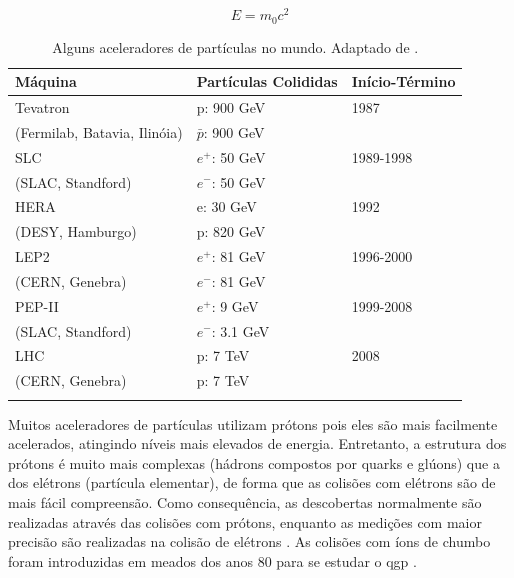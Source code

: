 
\begin{equation} \label{eq:einstein}
E=m_0c^2
\end{equation}

\begin{table}
\centering
\begin{tabular}{lll}
\hline \hline \hline
\textbf{Máquina} & \textbf{Partículas Colididas} & \textbf{Início-Término} \\
\hline \hline
Tevatron & p: 900 GeV & 1987 \\
(Fermilab, Batavia, Ilinóia) & $\bar{p}$: 900 GeV & \\
\hline
SLC & $e^{+}$: 50 GeV & 1989-1998 \\
(SLAC, Standford) & $e^{-}$: 50 GeV & \\
\hline
HERA & e: 30 GeV & 1992 \\
(DESY, Hamburgo) & p: 820 GeV & \\
\hline
LEP2 & $e^{+}$: 81 GeV & 1996-2000 \\
(CERN, Genebra) & $e^{-}$: 81 GeV & \\
\hline
PEP-II & $e^{+}$: 9 GeV & 1999-2008 \\
(SLAC, Standford) & $e^{-}$: 3.1 GeV & \\
\hline
LHC & p: 7 TeV & 2008 \\
(CERN, Genebra) & p: 7 TeV & \\
\hline \hline
\label{tab:aceleradores}
\end{tabular}
\caption{Alguns aceleradores de partículas no mundo. Adaptado de \cite{Intro_Standard}.}
\end{table}


Muitos aceleradores de partículas utilizam prótons pois eles são mais facilmente
acelerados, atingindo níveis mais elevados de energia. Entretanto, a
estrutura dos prótons é muito mais complexas (hádrons
compostos por quarks e glúons) que a dos elétrons (partícula elementar), de forma que as colisões com elétrons são 
de mais fácil compreensão. Como consequência, as
descobertas normalmente são realizadas através das colisões com prótons, enquanto as medições com
maior precisão são realizadas na colisão de elétrons \cite{nature_space_and_time}.
As colisões com íons de chumbo foram introduzidas em meados dos anos 80
para se estudar o \gls{qgp} \cite{heavy_ions}.

